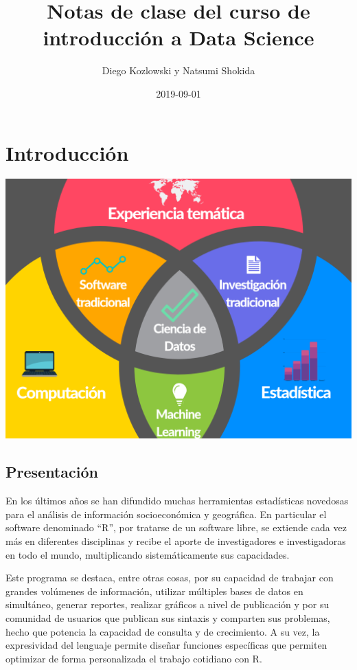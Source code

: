 \documentclass[]{book}
\title{Notas de clase del curso de introducción a Data Science}
\author{Diego Kozlowski y Natsumi Shokida}
\date{2019-09-01}
\begin{document}
\maketitle

{
\setcounter{tocdepth}{1}
\tableofcontents
}
\hypertarget{introduccion}{%
\chapter{Introducción}\label{introduccion}}

\includegraphics[width=10.41667in,height=\textheight]{img/venn_ds.png}

\hypertarget{presentacion}{%
\section{Presentación}\label{presentacion}}

En los últimos años se han difundido muchas herramientas estadísticas novedosas para el análisis de información socioeconómica y geográfica. En particular el software denominado ``R'', por tratarse de un software libre, se extiende cada vez más en diferentes disciplinas y recibe el aporte de investigadores e investigadoras en todo el mundo, multiplicando sistemáticamente sus capacidades.

Este programa se destaca, entre otras cosas, por su capacidad de trabajar con grandes volúmenes de información, utilizar múltiples bases de datos en simultáneo, generar reportes, realizar gráficos a nivel de publicación y por su comunidad de usuarios que publican sus sintaxis y comparten sus problemas, hecho que potencia la capacidad de consulta y de crecimiento. A su vez, la expresividad del lenguaje permite diseñar funciones específicas que permiten optimizar de forma personalizada el trabajo cotidiano con R.
\end{document}
